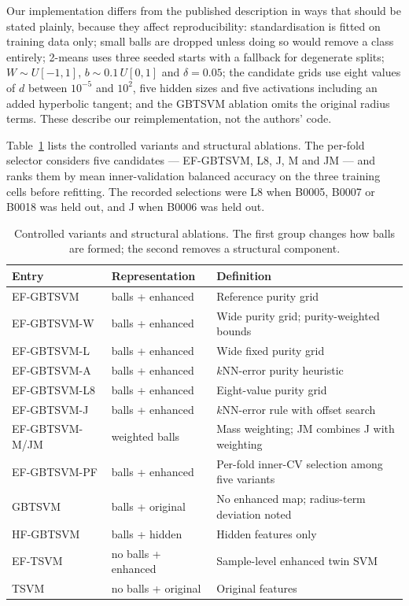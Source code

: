 \documentclass[final,5p,times,twocolumn]{elsarticle}
\newcommand{\proposed}{EF-GBTSVM-PF}
\begin{document}
Our implementation differs from the published description in ways that should be stated plainly, because they affect reproducibility: standardisation is fitted on training data only; small balls are dropped unless doing so would remove a class entirely; 2-means uses three seeded starts with a fallback for degenerate splits; $W\sim U[-1,1]$, $b\sim 0.1\,U[0,1]$ and $\delta=0.05$; the candidate grids use eight values of $d$ between $10^{-5}$ and $10^{2}$, five hidden sizes and five activations including an added hyperbolic tangent; and the GBTSVM ablation omits the original radius terms. These describe our reimplementation, not the authors' code.

Table~\ref{tab:variants} lists the controlled variants and structural ablations. The per-fold selector considers five candidates --- EF-GBTSVM, L8, J, M and JM --- and ranks them by mean inner-validation balanced accuracy on the three training cells before refitting. The recorded selections were L8 when B0005, B0007 or B0018 was held out, and J when B0006 was held out.
\begin{table}[!t]\centering\scriptsize\caption{Controlled variants and structural ablations. The first group changes how balls are formed; the second removes a structural component.}\label{tab:variants}\begin{tabularx}{\textwidth}{l l X}\toprule Entry&Representation&Definition\\\midrule EF-GBTSVM&balls + enhanced&Reference purity grid\\EF-GBTSVM-W&balls + enhanced&Wide purity grid; purity-weighted bounds\\EF-GBTSVM-L&balls + enhanced&Wide fixed purity grid\\EF-GBTSVM-A&balls + enhanced&$k$NN-error purity heuristic\\EF-GBTSVM-L8&balls + enhanced&Eight-value purity grid\\EF-GBTSVM-J&balls + enhanced&$k$NN-error rule with offset search\\EF-GBTSVM-M/JM&weighted balls&Mass weighting; JM combines J with weighting\\\proposed&balls + enhanced&Per-fold inner-CV selection among five variants\\\midrule GBTSVM&balls + original&No enhanced map; radius-term deviation noted\\HF-GBTSVM&balls + hidden&Hidden features only\\EF-TSVM&no balls + enhanced&Sample-level enhanced twin SVM\\TSVM&no balls + original&Original features\\\bottomrule\end{tabularx}\end{table}
\end{document}
